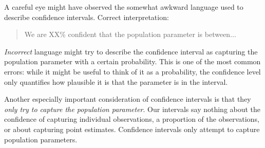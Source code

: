 
A careful eye might have observed the somewhat awkward language used to describe confidence intervals. Correct interpretation:
\begin{quote}
We are XX\% confident that the population parameter is between...
\end{quote}
\emph{Incorrect} language might try to describe the confidence interval as capturing the population parameter with a certain probability. This is one of the most common errors: while it might be useful to think of it as a probability, the confidence level only quantifies how plausible it is that the parameter is in the interval.

Another especially important consideration of confidence intervals is that they \emph{only try to capture the population parameter}. Our intervals say nothing about the confidence of capturing individual observations, a proportion of the observations, or about capturing point estimates. Confidence intervals only attempt to capture population parameters.




